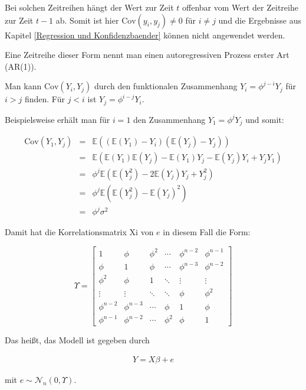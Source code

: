 \documentclass[12pt,a4paper]{article}
\theoremstyle{definition}
\theoremstyle{definition}
\theoremstyle{definition}
\theoremstyle{definition}
\begin{document}
Bei solchen Zeitreihen hängt der Wert zur Zeit $t$ offenbar vom Wert der Zeitreihe zur Zeit $t-1$ ab. Somit ist hier $\text{Cov}(y_i,y_j) \neq 0$ für $i \neq j$ und die Ergebnisse aus Kapitel \ref{Regression und Konfidenzbaender} können nicht angewendet werden. 

Eine Zeitreihe dieser Form nennt man einen autoregressiven Prozess erster Art (AR(1)).

Man kann $\text{Cov}(Y_i,Y_j)$ durch den funktionalen Zusammenhang $Y_i = \phi^{j-i} Y_j$ für $i>j$ finden. Für $j<i$ ist $Y_j = \phi^{i-j} Y_i$. 

Beispielsweise erhält man für $i=1$ den Zusammenhang $Y_1 = \phi^j Y_j$ und somit:

\begin{eqnarray*}
\text{Cov}(Y_1,Y_j) &=& \mathbb{E}((\mathbb{E}(Y_1)-Y_i)(\mathbb{E}(Y_j)-Y_j)) \\
&=& \mathbb{E}(\mathbb{E}(Y_1)\mathbb{E}(Y_j) - \mathbb{E}(Y_1)Y_j - \mathbb{E}(Y_j)Y_i +Y_j Y_1) \\
&=& \phi^j \mathbb{E}(\mathbb{E}(Y_j^2) - 2 \mathbb{E}(Y_j)Y_j + Y_j^2) \\
&=& \phi^j \mathbb{E}(\mathbb{E}(Y_j^2)-\mathbb{E}(Y_j)^2) \\
&=& \phi^j \sigma^2
\end{eqnarray*}

Damit hat die Korrelationsmatrix \gls{Xi} von $e$ in diesem Fall die Form:

\[
\Upsilon = 
\left[
   \begin{array}{cccccc}
     1 				& \phi 			& \phi^2	& \cdots	& \phi^{n-2}	& \phi^{n-1} 	\\
     \phi 			& 1		 		& \phi 		& \cdots	& \phi^{n-3}	& \phi^{n-2} 	\\
     \phi^2 		& \phi 			& 1		 	& \ddots	& \vdots		& \vdots 		\\
     \vdots		 	& \vdots	 	& \ddots	& \ddots	& \phi			& \phi^{2} 	\\
     \phi^{n-2} 	& \phi^{n-3}	& \cdots 	& \phi		& 1				& \phi 		\\
     \phi^{n-1} 	& \phi^{n-2} 	& \cdots	& \phi^{2}	& \phi			& 1  
   \end{array}
\right]
\]

Das heißt, das Modell ist gegeben durch 

\begin{align} \label{AR Modell}
Y = X \beta + e
\end{align}

mit $e \sim \mathscr{N}_{n}(0,\Upsilon)$.
\end{document}
